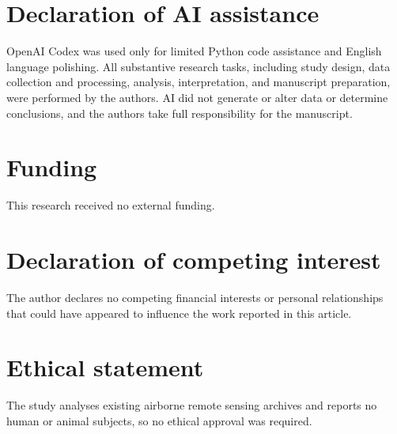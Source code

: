 \documentclass[a4paper,fleqn,longmktitle]{cas-sc}
\begin{document}
\section*{Declaration of AI assistance}

OpenAI Codex was used only for limited Python code assistance and English language polishing. All substantive research tasks, including study design, data collection and processing, analysis, interpretation, and manuscript preparation, were performed by the authors. AI did not generate or alter data or determine conclusions, and the authors take full responsibility for the manuscript.

\section*{Funding}

This research received no external funding.

\section*{Declaration of competing interest}

The author declares no competing financial interests or personal relationships that could have appeared to influence the work reported in this article.

\section*{Ethical statement}

The study analyses existing airborne remote sensing archives and reports no human or animal subjects, so no ethical approval was required.

\printcredits



\end{document}
